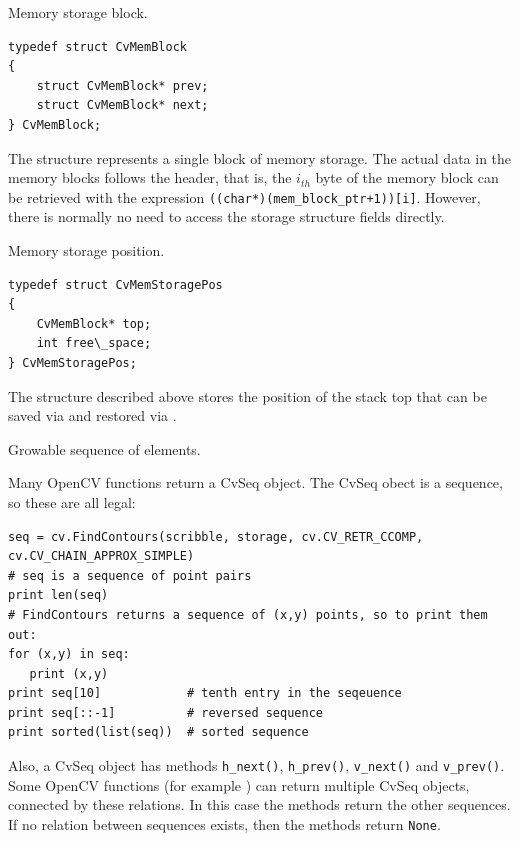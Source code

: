 \label{CvMemBlock}
Memory storage block.

\begin{lstlisting}
typedef struct CvMemBlock
{
    struct CvMemBlock* prev;
    struct CvMemBlock* next;
} CvMemBlock;
\end{lstlisting}

The structure  represents a single block of memory
storage. The actual data in the memory blocks follows the header, that is,
the $i_{th}$ byte of the memory block can be retrieved with the expression
\texttt{((char*)(mem\_block\_ptr+1))[i]}. However, there is normally no need
to access the storage structure fields directly.

\label{CvMemStoragePos}
Memory storage position.

\begin{lstlisting}
typedef struct CvMemStoragePos
{
    CvMemBlock* top;
    int free\_space;
} CvMemStoragePos;
\end{lstlisting}

The structure described above stores the position of the stack top that can be saved via  and restored via .

\fi

\label{CvSeq}
Growable sequence of elements.

\ifPy
Many OpenCV functions return a CvSeq object.  The CvSeq obect is a sequence, so these are all legal:
\begin{lstlisting}
seq = cv.FindContours(scribble, storage, cv.CV_RETR_CCOMP, cv.CV_CHAIN_APPROX_SIMPLE)
# seq is a sequence of point pairs
print len(seq)
# FindContours returns a sequence of (x,y) points, so to print them out:
for (x,y) in seq:
   print (x,y)
print seq[10]            # tenth entry in the seqeuence
print seq[::-1]          # reversed sequence
print sorted(list(seq))  # sorted sequence
\end{lstlisting}

Also, a CvSeq object has methods
\texttt{h\_next()},
\texttt{h\_prev()},
\texttt{v\_next()} and
\texttt{v\_prev()}.
Some OpenCV functions (for example ) can return multiple CvSeq objects, connected by these relations.
In this case the methods return the other sequences.  If no relation between sequences exists, then the methods return \texttt{None}.

\fi

